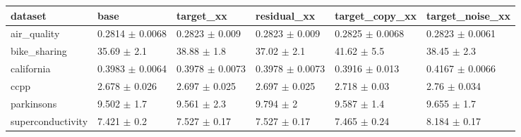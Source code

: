 \begin{tabular}{llllll}
\toprule
dataset & base & target\_xx & residual\_xx & target\_copy\_xx & target\_noise\_xx \\
\midrule
air\_quality & 0.2814 $\pm$ 0.0068 & 0.2823 $\pm$ 0.009 & 0.2823 $\pm$ 0.009 & 0.2825 $\pm$ 0.0068 & 0.2823 $\pm$ 0.0061 \\
bike\_sharing & 35.69 $\pm$ 2.1 & 38.88 $\pm$ 1.8 & 37.02 $\pm$ 2.1 & 41.62 $\pm$ 5.5 & 38.45 $\pm$ 2.3 \\
california & 0.3983 $\pm$ 0.0064 & 0.3978 $\pm$ 0.0073 & 0.3978 $\pm$ 0.0073 & 0.3916 $\pm$ 0.013 & 0.4167 $\pm$ 0.0066 \\
ccpp & 2.678 $\pm$ 0.026 & 2.697 $\pm$ 0.025 & 2.697 $\pm$ 0.025 & 2.718 $\pm$ 0.03 & 2.76 $\pm$ 0.034 \\
parkinsons & 9.502 $\pm$ 1.7 & 9.561 $\pm$ 2.3 & 9.794 $\pm$ 2 & 9.587 $\pm$ 1.4 & 9.655 $\pm$ 1.7 \\
superconductivity & 7.421 $\pm$ 0.2 & 7.527 $\pm$ 0.17 & 7.527 $\pm$ 0.17 & 7.465 $\pm$ 0.24 & 8.184 $\pm$ 0.17 \\
\bottomrule
\end{tabular}
